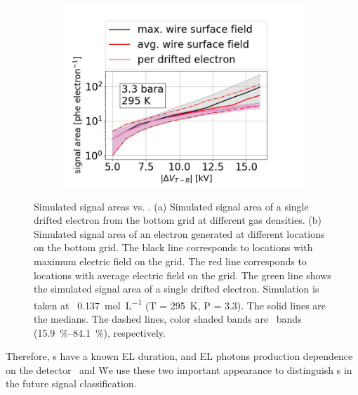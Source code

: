 \begin{figure}[!htbp]
\begin{subfigure}[b]{0.7\textwidth}
		\includegraphics[width=\figurewidth,clip,trim={0 0 0 0}]{Figures/GasTest/xenonProperties/MultiplicationPhotonCollectionNaiveProfileMeanSigma3300mbar.jpg}
		\caption{}
		\label{fig:photon per electron}
	\end{subfigure}
	\caption[Simulated signal areas vs. \opdv .]{Simulated signal areas vs. \opdv . (a) Simulated signal area of a single drifted electron from the bottom grid at different gas densities. (b) Simulated signal area of an electron generated at different locations on the bottom grid. The black line corresponds to locations with maximum electric field on the grid. The red line corresponds to locations with average electric field on the grid. The green line shows the simulated signal area of a single drifted electron. Simulation is taken at \opgd\ \SI{0.137}{\mole\per\liter} (T = \SI{295}{\kelvin}, P = \SI{3.3}{\bara}). The solid lines are the medians. The dashed lines, color shaded bands are \onesigma\ bands (\SIrange{15.9}{84.1}{\percent}), respectively.}
	\label{fig:photon per electron sim}
\end{figure}%

Therefore, \ees s  have a known EL duration, and EL photons production dependence on the detector \opgd\ and \opdv\. We use these two important appearance to distinguish \ees s in the future signal classification.

